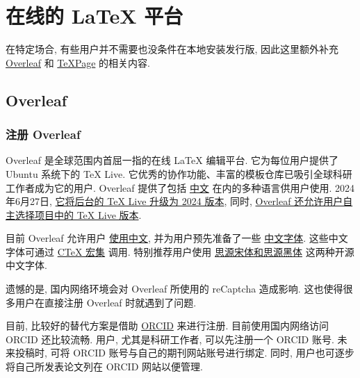 
\chapter{在线的 \LaTeX{} 平台}

在特定场合,
有些用户并不需要也没条件在本地安装发行版,
因此这里额外补充 \href{www.overleaf.com}{Overleaf} 和 \href{https://www.texpage.com/}{TeXPage} 的相关内容.

\section{Overleaf}

\subsection{注册 Overleaf}

Overleaf 是全球范围内首屈一指的在线 \LaTeX{} 编辑平台.
它为每位用户提供了 Ubuntu 系统下的 \TeX{} Live.
它优秀的协作功能、丰富的模板仓库已吸引全球科研工作者成为它的用户.
Overleaf 提供了包括%
\href{https://cn.overleaf.com}{中文}%
在内的多种语言供用户使用.
2024年6月27日,
\href{https://www.overleaf.com/blog/tex-live-2024-is-now-available}{它将后台的 \TeX{} Live 升级为 2024 版本},
同时,
\href{https://www.overleaf.com/blog/new-feature-select-your-tex-live-compiler-version}{Overleaf 还允许用户自主选择项目中的 \TeX{} Live 版本}.

目前 Overleaf 允许用户%
\href{https://www.overleaf.com/learn/latex/Chinese}{使用中文},
并为用户预先准备了一些%
\href{https://www.overleaf.com/learn/latex/Questions/Which_OTF_or_TTF_fonts_are_supported_via_fontspec%3F#Fonts_for_CJK}{中文字体}.
这些中文字体可通过%
\href{https://www.overleaf.com/latex/templates/using-the-ctex-package-on-overleaf-zai-overleafping-tai-shang-shi-yong-ctex/gndvpvsmjcqx}{C\TeX{} 宏集}%
调用.
特别推荐用户使用%
\href{https://www.overleaf.com/latex/examples/demonstration-of-noto-serif-cjk-and-noto-sans-cjk-fonts/sgrwgcddtqsq}{思源宋体和思源黑体}%
这两种开源中文字体.

遗憾的是,
国内网络环境会对 Overleaf 所使用的 reCaptcha 造成影响.
这也使得很多用户在直接注册 Overleaf 时就遇到了问题.

目前,
比较好的替代方案是借助 \href{https://orcid.org}{ORCID} 来进行注册.
目前使用国内网络访问 ORCID 还比较流畅.
用户, 尤其是科研工作者, 可以先注册一个 ORCID 账号.
未来投稿时,
可将 ORCID 账号与自己的期刊网站账号进行绑定.
同时,
用户也可逐步将自己所发表论文列在 ORCID 网站以便管理.

